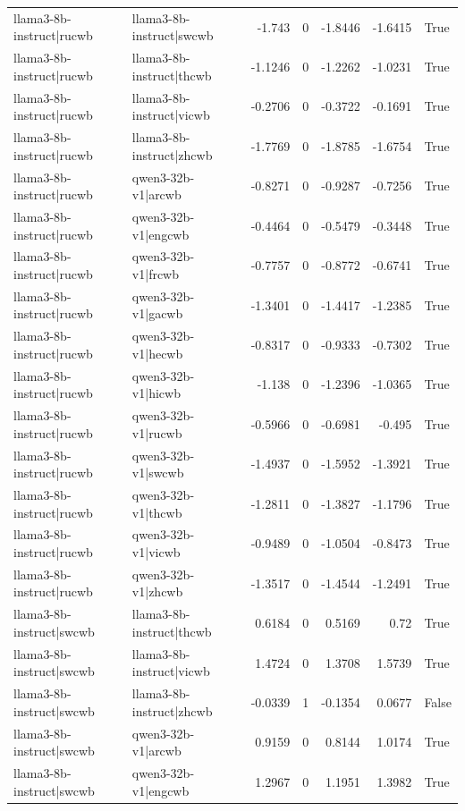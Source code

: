 \begin{table}
\begin{tabular}{l l r r r r l}
llama3-8b-instruct|rucwb & llama3-8b-instruct|swcwb & -1.743 & 0 & -1.8446 & -1.6415 & True \\
llama3-8b-instruct|rucwb & llama3-8b-instruct|thcwb & -1.1246 & 0 & -1.2262 & -1.0231 & True \\
llama3-8b-instruct|rucwb & llama3-8b-instruct|vicwb & -0.2706 & 0 & -0.3722 & -0.1691 & True \\
llama3-8b-instruct|rucwb & llama3-8b-instruct|zhcwb & -1.7769 & 0 & -1.8785 & -1.6754 & True \\
llama3-8b-instruct|rucwb & qwen3-32b-v1|arcwb & -0.8271 & 0 & -0.9287 & -0.7256 & True \\
llama3-8b-instruct|rucwb & qwen3-32b-v1|engcwb & -0.4464 & 0 & -0.5479 & -0.3448 & True \\
llama3-8b-instruct|rucwb & qwen3-32b-v1|frcwb & -0.7757 & 0 & -0.8772 & -0.6741 & True \\
llama3-8b-instruct|rucwb & qwen3-32b-v1|gacwb & -1.3401 & 0 & -1.4417 & -1.2385 & True \\
llama3-8b-instruct|rucwb & qwen3-32b-v1|hecwb & -0.8317 & 0 & -0.9333 & -0.7302 & True \\
llama3-8b-instruct|rucwb & qwen3-32b-v1|hicwb & -1.138 & 0 & -1.2396 & -1.0365 & True \\
llama3-8b-instruct|rucwb & qwen3-32b-v1|rucwb & -0.5966 & 0 & -0.6981 & -0.495 & True \\
llama3-8b-instruct|rucwb & qwen3-32b-v1|swcwb & -1.4937 & 0 & -1.5952 & -1.3921 & True \\
llama3-8b-instruct|rucwb & qwen3-32b-v1|thcwb & -1.2811 & 0 & -1.3827 & -1.1796 & True \\
llama3-8b-instruct|rucwb & qwen3-32b-v1|vicwb & -0.9489 & 0 & -1.0504 & -0.8473 & True \\
llama3-8b-instruct|rucwb & qwen3-32b-v1|zhcwb & -1.3517 & 0 & -1.4544 & -1.2491 & True \\
llama3-8b-instruct|swcwb & llama3-8b-instruct|thcwb & 0.6184 & 0 & 0.5169 & 0.72 & True \\
llama3-8b-instruct|swcwb & llama3-8b-instruct|vicwb & 1.4724 & 0 & 1.3708 & 1.5739 & True \\
llama3-8b-instruct|swcwb & llama3-8b-instruct|zhcwb & -0.0339 & 1 & -0.1354 & 0.0677 & False \\
llama3-8b-instruct|swcwb & qwen3-32b-v1|arcwb & 0.9159 & 0 & 0.8144 & 1.0174 & True \\
llama3-8b-instruct|swcwb & qwen3-32b-v1|engcwb & 1.2967 & 0 & 1.1951 & 1.3982 & True \\

\end{tabular}
\end{table}
